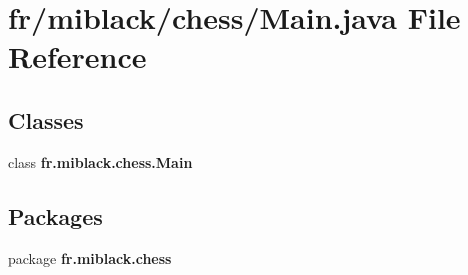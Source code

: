 \section{fr/miblack/chess/\-Main.java File Reference}
\label{Main_8java}
\subsection*{Classes}
\begin{DoxyCompactItemize}
\item 
class {\bf fr.\-miblack.\-chess.\-Main}
\end{DoxyCompactItemize}
\subsection*{Packages}
\begin{DoxyCompactItemize}
\item 
package {\bf fr.\-miblack.\-chess}
\end{DoxyCompactItemize}
